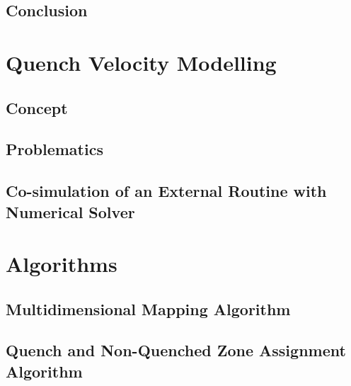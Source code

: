 \documentclass{article}
\begin{document}
\subsection{Conclusion}
\label{subsection: 1D_quench_propagation_conclusions}

 
\clearpage
\section{Quench Velocity Modelling}
\label{section:quench_velocity_modelling}

\subsection{Concept}
\label{subsection:quench_velocity_concept}


\subsection{Problematics}
\label{subsection:quench_velocity_problematics}


\subsection{Co-simulation of an External Routine with Numerical Solver}
\label{subsection:quench_velocity_cosimulation}


\clearpage
\section{Algorithms}
\label{section:algorithms}


\subsection{Multidimensional Mapping Algorithm}
\label{subsection:multidimensional_mapping_algorithm}


\subsection{Quench and Non-Quenched Zone Assignment Algorithm}
\label{subsection:node_searching_algorithm}

\end{document}
